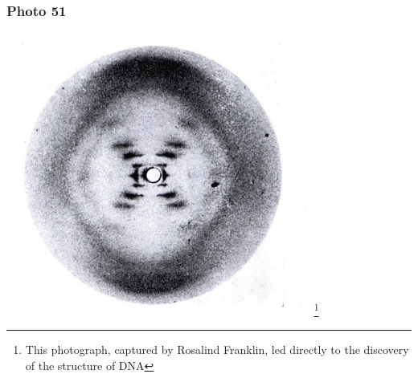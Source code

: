 \documentclass{beamer}
\newcommand\blfootnote[1]{%
	\begingroup
	\renewcommand\thefootnote{}\footnote{#1}%
	\addtocounter{footnote}{-1}%
	\endgroup
}
\begin{document}
		
		\begin{frame}
			\frametitle{Photo 51}
			\centering
			\includegraphics[keepaspectratio, width  =0.75\textwidth]{img/photo_51}  \blfootnote{This photograph, captured by Rosalind Franklin, led directly to the discovery of the structure of DNA}
			
		\end{frame}
	
	
	
\end{document}
